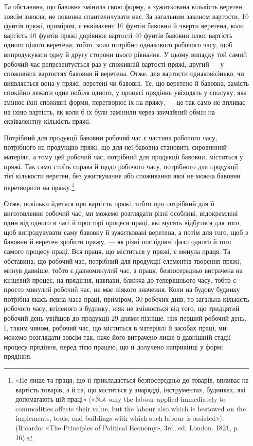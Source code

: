 Та обставина, що бавовна змінила свою форму, а зужиткована
кількість веретен зовсім зникла, не повинна спантеличувати
нас. За загальним законом вартости, 10 фунтів пряжі, приміром,
є еквівалент 10 фунтів бавовни й чверти веретена, коли вартість
40 фунтів пряжі дорівнює вартості 40 фунтів бавовни плюс вартість
одного цілого веретена, тобто, коли потрібно однакового
робочого часу, щоб випродукувати одну й другу сторони цього
рівнання. У цьому випадку той самий робочий час репрезентується
раз у споживній вартості пряжі, другий — у споживних
вартостях бавовни й веретена. Отже, для вартости однаковісінько,
чи виявляється вона у пряжі, веретені чи бавовні. Те, що
веретено й бавовна, замість спокійно лежати одне побіля одного,
у процесі прядіння увіходять у сполуку, яка змінює їхні споживні
форми, перетворює їх на пряжу, — це так само не впливає на
їхню вартість, як коли б їх були замінили через звичайний обмін
на еквівалентну кількість пряжі.

Потрібний для продукції бавовни робочий час є частина робочого
часу, потрібного на продукцію пряжі, що для неї бавовна
становить сировинний матеріял, а тому цей робочий час, потрібний
для продукції бавовни, міститься у пряжі. Так само стоїть
справа й щодо робочого часу, потрібного для продукції тієї кількости
веретен, без ужиткування або споживання якої не можна
бавовни перетворити на пряжу.\footnote{
«Не лише та праця, що її прикладається безпосередньо до товарів,
впливає на вартість товарів, а й та, що міститься у знарядді, інструментах,
будинках, які допомагають цій праці» («Not only the labour applied
immediately to commodities affects their value, but the labour also which
is bestowed on the implements, tools, and buildings with which such
labour is assisted»). (Ricardo: «The Principles of Political Economy», 3rd,
ed. London. 1821, p. 16).
}

Отже, оскільки йдеться про вартість пряжі, тобто про потрібний
для її виготовлення робочий час, ми можемо розглядати різні
особливі, відокремлені один від одного в часі й просторі процеси
праці, які мусять відбутися для того, щоб випродукувати саму
бавовну й зужитковані веретена, а потім для того, щоб з бавовни
й веретен зробити пряжу, — як різні послідовні фази одного й
того самого процесу праці. Вся праця, що міститься у пряжі,
є минула праця. Та обставина, що робочий час, потрібний для
продукції елементів творення пряжі, минув давніше, тобто є
давноминулий час, а праця, безпосередньо витрачена на кінцевий
процес, на прядіння, навпаки, ближча до теперішнього часу,
тобто є просто минулий робочий час, не має ніякого значення.
Коли на будову будинку потрібна якась певна маса праці, приміром,
30 робочих днів, то загальна кількість робочого часу,
втіленого в будинку, ніяк не змінюється від того, що тридцятий
робочий день увійшов до продукції 29 днями пізніше, ніж перший
робочий день. І, таким чином, робочий час, що міститься в матеріялі
й засобах праці, ми можемо розглядати зовсім так, наче
його витрачено лише в давнішній стадії процесу прядіння, перед
тією працею, що її долучено наприкінці у формі прядіння.

